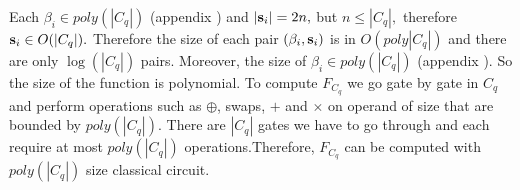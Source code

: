 Each $\beta_i \in poly(|C_q|)$ (appendix ) and $|{\bf s}_i|=2n,$ but $n\leq |C_q|,$ therefore ${\bf s}_i \in O(|C_q|).$  Therefore the size of each pair $(\beta_i, {\bf s}_i)$ is in $O(poly|C_q|)$ and there are only $\log(|C_q|)$ pairs.
 Moreover,  the size of $\beta_i \in poly(|C_q|)$ (appendix ). So the size of the function is polynomial. To compute $F_{C_q}$ we go gate by gate in $C_q$ and perform operations such as $\oplus$, swaps, $+$ and $\times$ on operand of size that are bounded by $poly(|C_q|).$ There are $|C_q|$ gates we have to go through and each require at most $poly(|C_q|)$
operations.Therefore, $F_{C_q}$ can be computed with $poly(|C_q|)$ size classical circuit.












